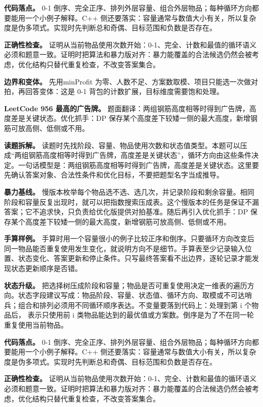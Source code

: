 \textbf{代码落点。} 0-1 倒序、完全正序、排列外层容量、组合外层物品；每种循环方向都要能用一个小例子解释。C++ 侧还要落实：容量通常与数值大小有关，所以复杂度是伪多项式。实现时先判断总和奇偶、目标范围和负数是否存在。

\textbf{正确性检查。} 证明从当前物品使用次数开始：0-1、完全、计数和最值的循环语义必须和题意一致。证明时把算法和暴力版对齐：暴力能覆盖的合法候选仍然会被考虑，优化结构只替代重复检查，不改变答案集合。

\textbf{边界和变体。} 先用minProfit 为零、人数不足、方案数取模、项目只能选一次做对拍，再回答变体：这是 0-1 背包的计数扩展，目标维度需要饱和处理。

\noindent\textbf{LeetCode 956 最高的广告牌。} 题面翻译：两组钢筋高度相等时得到广告牌，高度差是关键状态。优化抓手：DP 保存某个高度差下较矮一侧的最大高度，新增钢筋可放高侧、低侧或不用。

\textbf{读题拆解。} 读题时先找阶段、容量、物品使用次数和状态值类型。本题可以压成“两组钢筋高度相等时得到广告牌，高度差是关键状态”，循环方向由这些条件决定。一句话模型是：两组钢筋高度相等时得到广告牌，高度差是关键状态。这里要先确认答案对象、合法性条件和优化目标，不要把题型名字当成推导。

\textbf{暴力基线。} 慢版本枚举每个物品选不选、选几次，并记录阶段和剩余容量。相同阶段和容量反复出现时，就可以把指数搜索压成表。这个慢版本的任务是保证不漏答案；它不追求快，只负责给优化版提供对拍基准。随后再引入优化抓手：DP 保存某个高度差下较矮一侧的最大高度，新增钢筋可放高侧、低侧或不用。

\textbf{手算样例。} 手算时用一个容量很小的例子比较正序和倒序。只要循环方向改变后同一物品能否重复使用发生变化，就说明方向不是细节。手算表至少记录输入位置、状态变化、答案更新和停止条件。只写最终答案看不出边界，逐轮记录才能发现状态更新顺序是否错。

\textbf{状态升级。} 把选择树压成阶段和容量；物品是否可重复使用决定一维表的遍历方向。状态字段建议写成：物品阶段、容量、状态值、循环方向、取模或不可达哨兵；组合和排列必须用不同循环顺序表达。不变量要落到代码上：处理到第 i 个物品后， 表示只使用前 i 类物品能达到的最优值或方案数。倒序是为了不在同一轮重复使用当前物品。

\textbf{代码落点。} 0-1 倒序、完全正序、排列外层容量、组合外层物品；每种循环方向都要能用一个小例子解释。C++ 侧还要落实：容量通常与数值大小有关，所以复杂度是伪多项式。实现时先判断总和奇偶、目标范围和负数是否存在。

\textbf{正确性检查。} 证明从当前物品使用次数开始：0-1、完全、计数和最值的循环语义必须和题意一致。证明时把算法和暴力版对齐：暴力能覆盖的合法候选仍然会被考虑，优化结构只替代重复检查，不改变答案集合。

